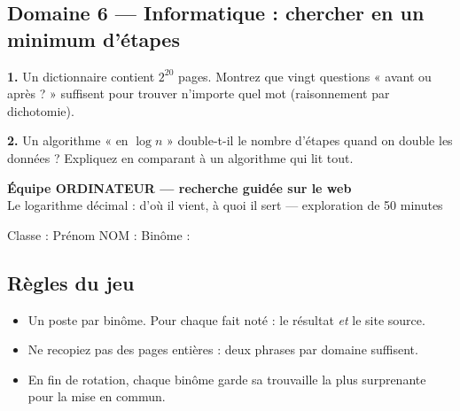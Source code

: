 \documentclass[11pt,a4paper]{article}
\newcommand{\champ}[1]{\makebox[#1]{\dotfill}}
\begin{document}
\subsection*{Domaine 6 --- Informatique : chercher en un minimum d'étapes}
\textbf{1.} Un dictionnaire contient $2^{20}$ pages. Montrez que vingt questions « avant ou après ? » suffisent pour trouver n'importe quel mot (raisonnement par dichotomie).
\par\smallskip
\noindent\makebox[\linewidth]{\dotfill}\par\vspace{1em}
\noindent\makebox[\linewidth]{\dotfill}\par\vspace{1em}
\noindent\makebox[\linewidth]{\dotfill}\par\vspace{1em}
\par\medskip
\textbf{2.} Un algorithme « en $\log n$ » double-t-il le nombre d'étapes quand on double les données ? Expliquez en comparant à un algorithme qui lit tout.
\par\smallskip
\noindent\makebox[\linewidth]{\dotfill}\par\vspace{1em}
\noindent\makebox[\linewidth]{\dotfill}\par\vspace{1em}
\noindent\makebox[\linewidth]{\dotfill}\par\vspace{1em}
\par\medskip
\newpage
\begin{center}{\Large\bfseries Équipe ORDINATEUR --- recherche guidée sur le web}\\[4pt]{\small Le logarithme décimal : d'où il vient, à quoi il sert --- exploration de 50 minutes}\end{center}
{\small Classe : \champ{3.2cm}\hfill Prénom NOM : \champ{3.2cm}\hfill Binôme : \champ{2.2cm}}
\subsection*{Règles du jeu}
\begin{itemize}[leftmargin=1.4em,itemsep=2pt]
\item Un poste par binôme. Pour chaque fait noté : le résultat \emph{et} le site source.
\item Ne recopiez pas des pages entières : deux phrases par domaine suffisent.
\item En fin de rotation, chaque binôme garde sa trouvaille la plus surprenante pour la mise en commun.
\end{itemize}
\end{document}
